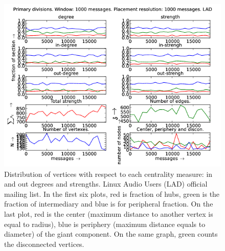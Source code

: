 \documentclass[%
 aip,
 jmp,%
 amsmath,amssymb,
 reprint,%
]{revtex4-1}
\begin{document}
\begin{figure}[hbtp] 
   \centering
        \includegraphics[width=\textwidth]{figs/LAD/1000}
    \caption{Distribution of vertices with respect to each centrality measure: in and out degrees and strengths. Linux Audio Users (LAD) official mailing list. In the first six plots, red is fraction of hubs, green is the fraction of intermediary and blue is for peripheral fraction. On the last plot, red is the center (maximum distance to another vertex is equal to radius), blue is periphery (maximum distance equals to diameter) of the giant component. On the same graph, green counts the disconnected vertices.}
    \label{fig:lad1000}
\end{figure}
\end{document}
